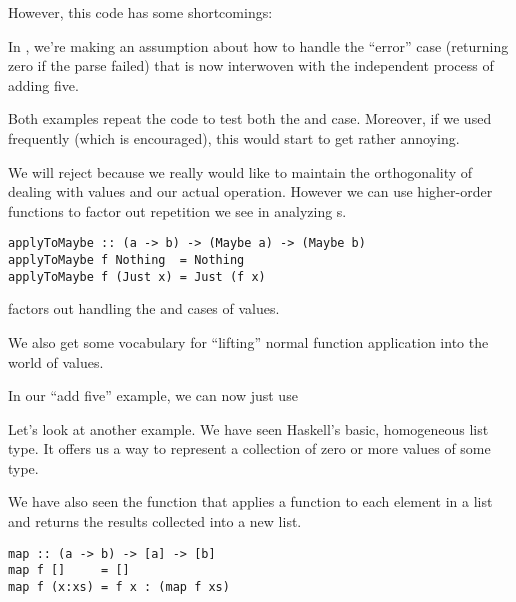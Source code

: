\begin{notelist}
    \item However, this code has some shortcomings:
    \begin{notelist}
        \item In , we're making an assumption about how to handle the ``error'' case
              (returning zero if the parse failed) that is now interwoven with the independent process
              of adding five.
        \item Both examples repeat the code to test both the  and  case. Moreover,
              if we used  frequently (which is encouraged), this would start to get rather
              annoying.
    \end{notelist}
\end{notelist}

We will reject  because we really would like to maintain the orthogonality of
dealing with  values and our actual operation. However we can use higher-order
functions to factor out repetition we see in analyzing s.

\begin{lstlisting}
applyToMaybe :: (a -> b) -> (Maybe a) -> (Maybe b)
applyToMaybe f Nothing  = Nothing
applyToMaybe f (Just x) = Just (f x)
\end{lstlisting}

\begin{notelist}
    \item {} factors out handling the  and  cases of 
          values.
    \item We also get some vocabulary for ``lifting'' normal function application into the world of 
          values.
    \item In our ``add five'' example, we can now just use 
\end{notelist}

Let's look at another example. We have seen Haskell's basic, homogeneous list type. It offers us a way to
represent a collection of zero or more values of some type.

We have also seen the function  that applies a function
to each element in a list and returns the results collected into a new list. 

\begin{lstlisting}
map :: (a -> b) -> [a] -> [b]
map f []     = []
map f (x:xs) = f x : (map f xs)
\end{lstlisting}

